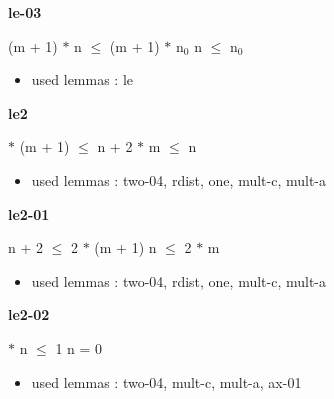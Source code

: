 \documentclass[a4paper]{article}
\begin{document}
\medskip

\bigskip

{\large\bf le-03}

\medskip

 \Fol (m + 1) $*$ n $\le$ (m + 1) $*$ $\mbox{n}_{0}$ \Equiv n $\le$ $\mbox{n}_{0}$

\begin{itemize}


\item       used lemmas  : le

\end{itemize}

\medskip

\bigskip

{\large\bf le2}

\medskip

  $*$ (m + 1) $\le$ n + 2  $*$ m $\le$ n

\begin{itemize}


\item       used lemmas  : two-04, rdist, one, mult-c, mult-a

\end{itemize}

\medskip

\bigskip

{\large\bf le2-01}

\medskip

 \Fol n + 2 $\le$ 2 $*$ (m + 1) \Equiv n $\le$ 2 $*$ m

\begin{itemize}


\item       used lemmas  : two-04, rdist, one, mult-c, mult-a

\end{itemize}

\medskip

\bigskip

{\large\bf le2-02}

\medskip

  $*$ n $\le$ 1 \Equiv n = 0

\begin{itemize}


\item       used lemmas  : two-04, mult-c, mult-a, ax-01

\end{itemize}

\medskip

\bigskip
\end{document}
